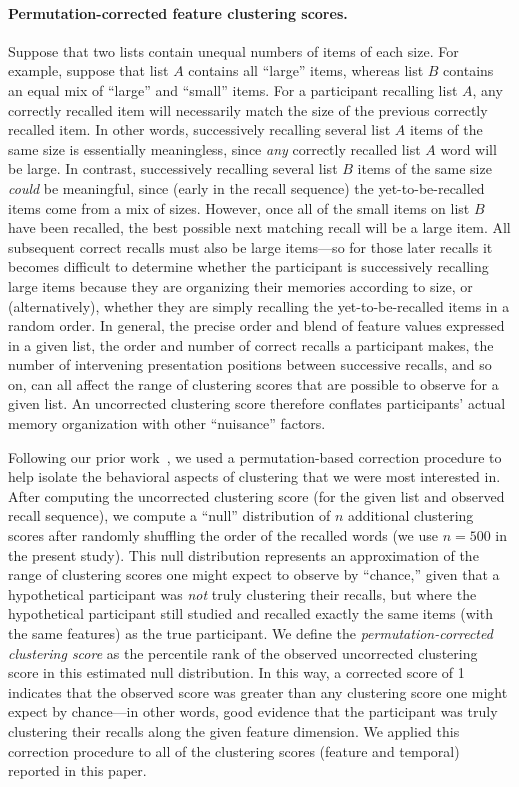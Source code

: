 \documentclass[11pt]{article}
\begin{document}
\paragraph*{Permutation-corrected feature clustering scores.}

Suppose that two lists contain unequal numbers of items of each size. For
example, suppose that list $A$ contains all ``large'' items, whereas list $B$
contains an equal mix of ``large'' and ``small'' items. For a participant
recalling list $A$, any correctly recalled item will necessarily match the size
of the previous correctly recalled item. In other words, successively recalling
several list $A$ items of the same size is essentially meaningless, since
\textit{any} correctly recalled list $A$ word will be large. In contrast,
successively recalling several list $B$ items of the same size \textit{could}
be meaningful, since (early in the recall sequence) the yet-to-be-recalled
items come from a mix of sizes. However, once all of the small items on list
$B$ have been recalled, the best possible next matching recall will be a large
item. All subsequent correct recalls must also be large items---so for
those later recalls it becomes difficult to determine whether the participant
is successively recalling large items because they are organizing their
memories according to size, or (alternatively), whether they are simply
recalling the yet-to-be-recalled items in a random order. In general, the
precise order and blend of feature values expressed in a given list, the order
and number of correct recalls a participant makes, the number of intervening
presentation positions between successive recalls, and so on, can all affect
the range of clustering scores that are possible to observe for a given list.
An uncorrected clustering score therefore conflates participants' actual memory
organization with other ``nuisance'' factors.

Following our prior work~\citep{HeusEtal17}, we used a permutation-based
correction procedure to help isolate the behavioral aspects of clustering that
we were most interested in. After computing the uncorrected clustering score
(for the given list and observed recall sequence), we compute a ``null''
distribution of $n$ additional clustering scores after randomly shuffling the
order of the recalled words (we use $n = 500$ in the present study). This null
distribution represents an approximation of the range of clustering scores one
might expect to observe by ``chance,'' given that a hypothetical participant
was \textit{not} truly clustering their recalls, but where the hypothetical
participant still studied and recalled exactly the same items (with the same
features) as the true participant. We define the \textit{permutation-corrected
clustering score} as the percentile rank of the observed uncorrected clustering
score in this estimated null distribution. In this way, a corrected score of 1
indicates that the observed score was greater than any clustering score one
might expect by chance---in other words, good evidence that the participant was
truly clustering their recalls along the given feature dimension. We applied
this correction procedure to all of the clustering scores (feature and
temporal) reported in this paper.
\end{document}
